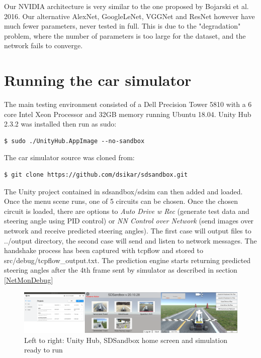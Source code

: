 Our NVIDIA architecture is very similar to the one proposed by Bojarski et al. 2016. Our alternative AlexNet, GoogleLeNet, VGGNet and ResNet however have much fewer parameters, never tested in full. This is due to the "degradation" problem, where the number of parameters is too large for the dataset, and the network fails to converge.


\section{Running the car simulator}
\label{RunningCarSimulatorForInference}

The main testing environment consisted of a Dell Precision Tower 5810 with a 6 core Intel Xeon Processor and 32GB memory running Ubuntu 18.04. Unity Hub 2.3.2 was installed then run as sudo:
\begin{verbatim}
$ sudo ./UnityHub.AppImage --no-sandbox 
\end{verbatim}
The car simulator source was cloned from:
\begin{verbatim}
$ git clone https://github.com/dsikar/sdsandbox.git    
\end{verbatim}
The Unity project contained in sdsandbox/sdsim can then added and loaded.
Once the menu scene runs, one of 5 circuits can be chosen. Once the chosen circuit is loaded, there are options to \textit{Auto Drive w Rec} (generate test data and steering angle using PID control) or \textit{NN Control over Network} (send images over network and receive predicted steering angles). The first case will output files to ../output directory, the second case will send and listen to network messages. The handshake process has been captured with tcpflow and stored to  src/debug/tcpflow\_output.txt. The prediction engine starts returning predicted steering angles after the 4th frame sent by simulator as described in section \ref{NetMonDebug}

\begin{figure}[ht]
 \centering 
 \includegraphics[scale=0.17]{Figures/UnityHubSDSandbox3in1.png}
 \caption{Left to right: Unity Hub, SDSandbox home screen and simulation ready to run}
 \label{fig:SDSandboxHome}
\end{figure}

